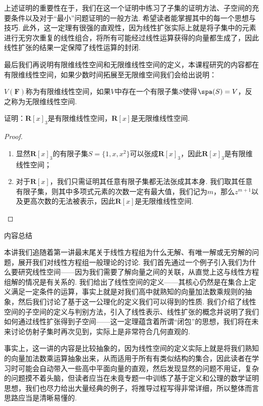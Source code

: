 上述证明的重要性在于，我们在这一个证明中练习了子集的证明方法、子空间的充要条件以及对于``最小''问题证明的一般方法. 希望读者能掌握其中的每一个思想与技巧. 此外，这一定理有很强的直观性，因为线性扩张实际上就是将子集中的元素进行无穷次重复的线性组合，将所有可能经过线性运算获得的向量都生成了，因此线性扩张的结果一定保障了线性运算的封闭.

最后我们再说明有限维线性空间和无限维线性空间的定义，本课程研究的内容都在有限维线性空间，如果少数时间拓展至无限维空间我们会给出说明：
\begin{definition}
    $V(\mathbf{F})$称为有限维线性空间，如果$V$中存在一个有限子集$S$使得$\spa(S)=V$，反之称为无限维线性空间.
\end{definition}

\begin{example}
    证明：$\mathbf{R}[x]_3$是有限维线性空间，$\mathbf{R}[x]$是无限维线性空间.
\end{example}

\begin{proof}
    \begin{enumerate}
        \item 显然$\mathbf{R}[x]_3$的有限子集$S=\{1,x,x^2\}$可以张成$\mathbf{R}[x]_3$，因此$\mathbf{R}[x]_3$是有限维线性空间；

        \item 对于$\mathbf{R}[x]$，我们只需证明其任意有限子集都无法张成其本身. 我们取其任意有限子集，则其中多项式元素的次数一定有最大值，我们记为$m$，那么$z^{m+1}$以及更高次数的无法被表示，因此$\mathbf{R}[x]$是无限维线性空间.
    \end{enumerate}
\end{proof}

\vspace{2ex}
\centerline{\heiti \Large 内容总结}

本讲我们追随着第一讲最末尾关于线性方程组为什么无解、有唯一解或无穷解的问题，展开我们对线性方程组一般理论的讨论. 我们首先通过一个例子引入我们为什么要研究线性空间——因为我们需要了解向量之间的关联，从直觉上这与线性方程组解的情况是有关系的. 我们给出了线性空间的定义——其核心仍然是在集合上定义满足一定条件的运算，事实上就是对我们高中就熟知的向量加法数乘规则的抽象，然后我们讨论了基于这一公理化的定义我们可以得到的性质. 我们介绍了线性空间的子空间的定义与判别方法，引入了线性表示、线性扩张的概念并说明了我们如何通过线性扩张得到子空间——这一定理蕴含着所谓``闭包''的思想，我们将在未来讨论仿射子集时再次见到，实际上是非常符合几何直观的.

事实上，这一讲的内容是比较抽象的，因为线性空间的定义实际上就是将我们熟知的向量加法数乘运算抽象出来，从而适用于所有有类似结构的集合，因此读者在学习时可能会自动带入一些高中平面向量的直观，然后发现显然的问题不用证，复杂的问题摸不着头脑，但读者应当在未竟专题一中训练了基于定义和公理的数学证明思想，我们也尽力给出大量经典的例子，将推导过程写得非常详细，所以整体而言思路应当是清晰易懂的.

